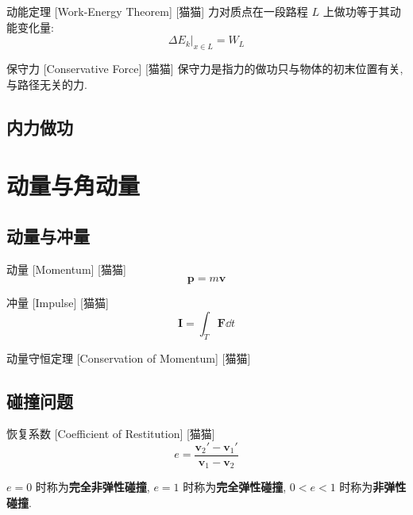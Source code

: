 \documentclass[UTF8]{ctexart}
\begin{document}
        \begin{thm}
            []
            {动能定理}
            [Work-Energy Theorem]
            [猫猫]
            力对质点在一段路程 \(L\) 上做功等于其动能变化量: 
            \[\Delta E_k|_{x\in L}=W_L\]
        \end{thm}
        
        \begin{dfn}
            []
            {保守力}
            [Conservative Force]
            [猫猫]
            保守力是指力的做功只与物体的初末位置有关, 与路径无关的力. 
        \end{dfn}
    
    \subsection{内力做功}
        

\section{动量与角动量}

    \subsection{动量与冲量}
        
        \begin{dfn}
            []
            {动量}
            [Momentum]
            [猫猫]
            \[\bm{p}=m\bm{v}\]
        \end{dfn}
        
        \begin{dfn}
            []
            {冲量}
            [Impulse]
            [猫猫]
            \[\bm{I}=\int_T\bm{F}\dd t\]
        \end{dfn}
        
        \begin{thm}
            []
            {动量守恒定理}
            [Conservation of Momentum]
            [猫猫]
        \end{thm}
    
    \subsection{碰撞问题}
        
        \begin{dfn}
            []
            {恢复系数}
            [Coefficient of Restitution]
            [猫猫]
            \[e=\frac{\bm{v}_2'-\bm{v}_1'}{\bm{v}_1-\bm{v}_2}\]

            \(e=0\) 时称为\textbf{完全非弹性碰撞}, \(e=1\) 时称为\textbf{完全弹性碰撞}, \(0<e<1\) 时称为\textbf{非弹性碰撞}. 
        \end{dfn}
\end{document}
